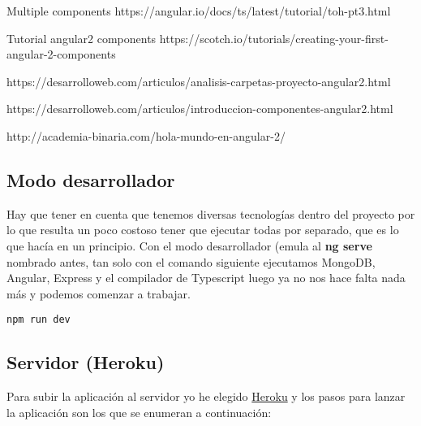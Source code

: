 Multiple components
https://angular.io/docs/ts/latest/tutorial/toh-pt3.html

Tutorial angular2 components
https://scotch.io/tutorials/creating-your-first-angular-2-components

https://desarrolloweb.com/articulos/analisis-carpetas-proyecto-angular2.html


https://desarrolloweb.com/articulos/introduccion-componentes-angular2.html

http://academia-binaria.com/hola-mundo-en-angular-2/


\subsection{Modo desarrollador}

Hay que tener en cuenta que tenemos diversas tecnologías dentro del proyecto por lo que resulta un poco costoso tener que ejecutar todas por separado, que es lo que hacía en un principio. Con el modo desarrollador (emula al \textbf{ng serve} nombrado antes, tan solo con el comando siguiente ejecutamos MongoDB, Angular, Express y el compilador de Typescript luego ya no nos hace falta nada más y podemos comenzar a trabajar. 

	\lstset{language=C, breaklines=true, basicstyle=\footnotesize}
		\begin{lstlisting}[frame=single]
		npm run dev
    	\end{lstlisting}

\subsection{Servidor (Heroku)}
Para subir la aplicación al servidor yo he elegido \hyperlink{https://www.heroku.com/}{Heroku} y los pasos para lanzar la aplicación son los que se enumeran a continuación:


